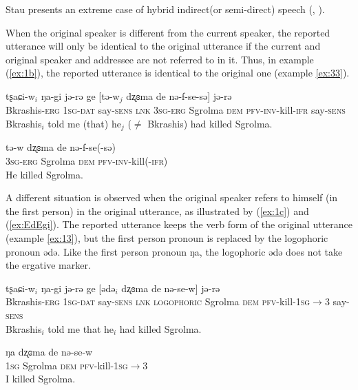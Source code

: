 \documentclass[oneside,a4paper,11pt]{article}
\newcommand{\ipa}[1]{{\phon #1}} %
\newcommand{\ipapl}[1]{{\phon #1}} %
\newcommand{\dat}{\textsc{dat}}
\newcommand{\dem}{\textsc{dem}}
\newcommand{\evid}{\textsc{ifr}}
\newcommand{\erg}{\textsc{erg}}
\newcommand{\inv}{\textsc{inv}}
\newcommand{\prf}{\textsc{pfv}}
\newcommand{\sg}{\textsc{sg}}
\newcommand{\sens}{\textsc{sens}}
\begin{document}
Stau presents an extreme case of hybrid indirect(or semi-direct)  speech  (\citealt{aikhenvald08semidirect}, \citealt{tournadre08conjunct}). 

When the original speaker is different from the current speaker, the reported utterance will only be identical to the original utterance if the current and original speaker and addressee are not referred to in it. Thus, in example (\ref{ex:1b}), the reported utterance is identical to the original one (example \ref{ex:33}).


\begin{exe}
\ex \label{ex:1b}
\gll
	\ipa{tʂaɕi-w}$_i$ \ipa{ŋa-gi}	\ipa{jə-rə} \ipa{ge} [\ipapl{tə-w}$_j$	\ipapl{dʐɞma} 	\ipapl{de} \ipapl{nə-f-se-sə}] \ipa{jə-rə}  \\
	{Bkrashis-\erg} {1\sg-\dat} {say-\sens} \textsc{lnk} {3\sg-\erg} Sgrolma {\dem} {\prf-\inv-kill-\evid}  say-\sens\\ 
	\glt Bkrashis$_i$ told me (that) he$_j$ ($\ne$ Bkrashis) had killed Sgrolma.
\end{exe}


\begin{exe}
\ex \label{ex:33}
\gll
	\ipa{tə-w} \ipapl{dʐɞma} \ipapl{de} \ipapl{nə-f-se(-sə)} \\
	{3\sg-\erg} Sgrolma {\dem} {\prf-\inv-kill(-\evid)}\\ 
	\glt He killed Sgrolma.
\end{exe}

A different situation is observed when the original speaker refers to himself (in the first person) in the original utterance, as illustrated by (\ref{ex:1c}) and (\ref{ex:EdEgi}).  The reported utterance keeps the verb form of the original utterance (example \ref{ex:13}), but the first person pronoun is replaced by the logophoric pronoun \ipa{ədə}. Like the first person pronoun \ipa{ŋa}, the logophoric \ipa{ədə} does not take the ergative marker.

\begin{exe}
\ex \label{ex:1c}
\gll
	\ipa{tʂaɕi-w}$_i$ \ipa{ŋa-gi}	\ipa{jə-rə} \ipa{ge} [\ipapl{ədə}$_i$	\ipapl{dʐɞma} 	\ipapl{de} 	\ipapl{nə-se-w}] \ipa{jə-rə}  \\
	{Bkrashis-\erg} {1\sg-\dat} {say-\sens} \textsc{lnk} \textsc{logophoric} Sgrolma {\dem} {\prf-kill-1\sg$\rightarrow$3} say-\sens\\ 
	\glt Bkrashis$_i$ told me that he$_i$ had killed Sgrolma.
\end{exe}


\begin{exe}
\ex \label{ex:13}
\gll
	\ipa{ŋa}	\ipapl{dʐɞma} 	\ipapl{de} 	\ipapl{nə-se-w} \\
	{1\sg} Sgrolma {\dem} {\prf-kill-1\sg$\rightarrow$3}\\ 
	\glt I killed Sgrolma.
\end{exe}
\end{document}
